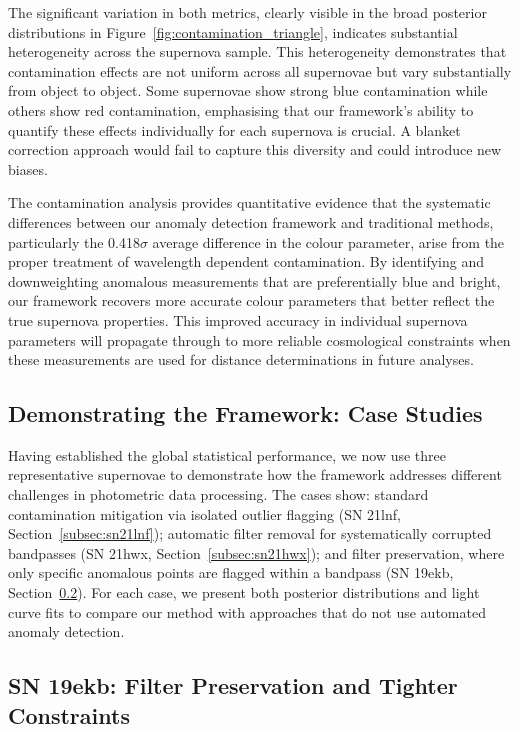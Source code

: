 The significant variation in both metrics, clearly visible in the broad posterior distributions in Figure~\ref{fig:contamination_triangle}, indicates substantial heterogeneity across the supernova sample. This heterogeneity demonstrates that contamination effects are not uniform across all supernovae but vary substantially from object to object. Some supernovae show strong blue contamination while others show red contamination, emphasising that our framework's ability to quantify these effects individually for each supernova is crucial. A blanket correction approach would fail to capture this diversity and could introduce new biases.

The contamination analysis provides quantitative evidence that the systematic differences between our anomaly detection framework and traditional methods, particularly the 0.418$\sigma$ average difference in the colour parameter, arise from the proper treatment of wavelength dependent contamination. By identifying and downweighting anomalous measurements that are preferentially blue and bright, our framework recovers more accurate colour parameters that better reflect the true supernova properties. This improved accuracy in individual supernova parameters will propagate through to more reliable cosmological constraints when these measurements are used for distance determinations in future analyses.

\subsection{Demonstrating the Framework: Case Studies}

Having established the global statistical performance, we now use three representative supernovae to demonstrate how the framework addresses different challenges in photometric data processing. The cases show: standard contamination mitigation via isolated outlier flagging (SN 21lnf, Section~\ref{subsec:sn21lnf}); automatic filter removal for systematically corrupted bandpasses (SN 21hwx, Section~\ref{subsec:sn21hwx}); and filter preservation, where only specific anomalous points are flagged within a bandpass (SN 19ekb, Section~\ref{subsec:sn19ekb}). For each case, we present both posterior distributions and light curve fits to compare our method with approaches that do not use automated anomaly detection.

\subsection{SN 19ekb: Filter Preservation and Tighter Constraints}
\label{subsec:sn19ekb}

